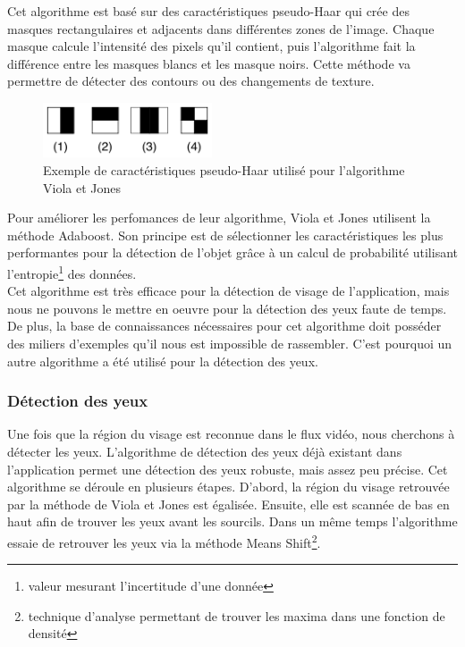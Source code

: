 Cet algorithme est basé sur des caractéristiques pseudo-Haar qui crée des masques rectangulaires et adjacents
dans différentes zones de l'image. Chaque masque calcule l'intensité des pixels qu'il contient, puis l'algorithme fait
la différence entre les masques blancs et les masque noirs. Cette méthode va permettre de détecter des contours ou des changements de 
texture.\\

\begin{figure}[H]
\center
\includegraphics[width=5cm]{image/pseudo_haar.png}
\caption{Exemple de caractéristiques pseudo-Haar utilisé pour l'algorithme Viola et Jones}
\end{figure}

Pour améliorer les perfomances de leur algorithme, Viola et Jones utilisent la méthode Adaboost. Son
principe est de sélectionner les caractéristiques les plus performantes pour la détection de l'objet grâce à
un calcul de probabilité utilisant l'entropie\footnote{valeur mesurant l'incertitude d'une donnée} des données.\\

Cet algorithme est très efficace pour la détection de visage de l'application, mais nous ne pouvons le mettre
en oeuvre pour la détection des yeux faute de temps. De plus, la base de connaissances nécessaires pour cet 
algorithme doit posséder des miliers d'exemples qu'il nous est impossible de rassembler. C'est pourquoi
un autre algorithme a été utilisé pour la détection des yeux.

\subsubsection{Détection des yeux}
Une fois que la région du visage est reconnue dans le flux vidéo, nous cherchons à détecter les yeux. 
L'algorithme de détection des yeux déjà existant dans l'application permet une détection des yeux 
robuste, mais assez peu précise. Cet algorithme se déroule en plusieurs étapes. D'abord, la région du visage 
retrouvée par la méthode de Viola et Jones est égalisée. Ensuite, elle est scannée de bas en haut afin de
trouver les yeux avant les sourcils. Dans un même temps l'algorithme essaie de retrouver les yeux via la
méthode Means Shift\footnote{technique d'analyse permettant de trouver les maxima dans une fonction de densité}.



